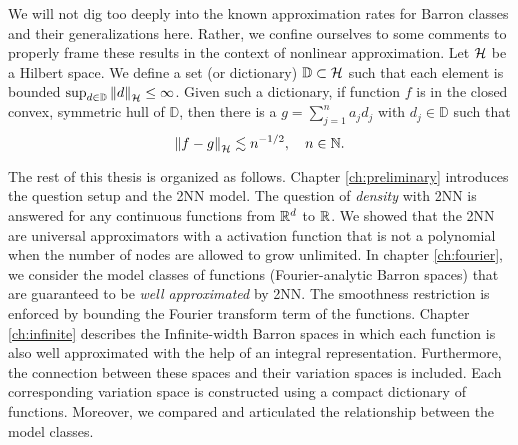 
We will not dig too deeply into the known approximation rates for Barron classes
and their generalizations here. Rather, we confine ourselves to some comments to
properly frame these results in the context of nonlinear approximation. Let
$\mathcal{H}$ be a Hilbert space. We define a set (or dictionary) $\mathbb{D}
\subset \mathcal{H}$ such that each element is bounded $\sup_{d\in\mathbb{D}}
\left\| d \right\|_{\mathcal{H}} \leq \infty$. Given such a dictionary, if function $f$ is in
the closed convex, symmetric hull of $\mathbb{D}$, then there is a $g =
\sum_{j=1}^n a_j d_j$ with $d_j \in \mathbb{D}$ such that
\begin{equation}
    \left\| f - g \right\|_{\mathcal{H}} \lesssim n^{-1/2}, \quad n \in \mathbb{N}.
\end{equation}









The rest of this thesis is organized as follows. Chapter \ref{ch:preliminary}
introduces the question setup and the 2NN model. The question of
\textit{density} with 2NN is answered for any continuous functions from $\mathbb{R}^d$
to $\mathbb{R}$. We showed that the 2NN are universal approximators with a activation
function that is not a polynomial when the number of nodes are allowed to grow
unlimited. In chapter \ref{ch:fourier}, we consider the model classes of
functions (Fourier-analytic Barron spaces) that are guaranteed to be
\textit{well approximated} by 2NN. The smoothness restriction is enforced by
bounding the Fourier transform term of the functions. Chapter \ref{ch:infinite}
describes the Infinite-width Barron spaces in which each function is also well
approximated with the help of an integral representation. Furthermore, the
connection between these spaces and their variation spaces is included. Each
corresponding variation space is constructed using a compact dictionary of
functions. Moreover, we compared and articulated the relationship between the
model classes.

